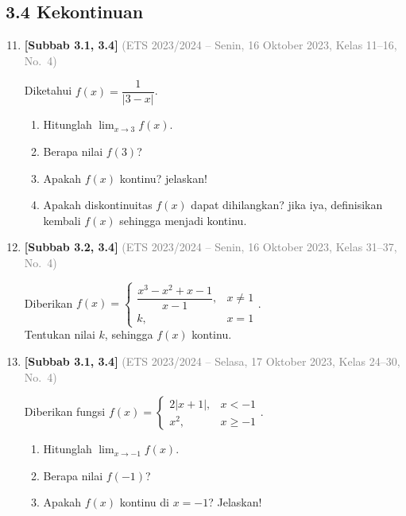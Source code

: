 \documentclass[10pt,openany,a4paper]{article}
\theoremstyle{definition}
\theoremstyle{definition}
\theoremstyle{plain}
\begin{document}
\subsection*{3.4 \quad Kekontinuan}
\begin{enumerate}
\setcounter{enumi}{10}
    \item \textbf{[Subbab 3.1, 3.4]} {\footnotesize\textcolor{gray}{(ETS 2023/2024 -- Senin, 16 Oktober 2023, Kelas 11--16, No.~4)}}\par
    Diketahui $f(x)=\dfrac{1}{|3-x|}$.
    \begin{enumerate}
        \item Hitunglah $\displaystyle\lim_{x\to 3}f(x)$.
        \item Berapa nilai $f(3)$?
        \item Apakah $f(x)$ kontinu? jelaskan!
        \item Apakah diskontinuitas $f(x)$ dapat dihilangkan? jika iya, definisikan kembali $f(x)$ sehingga menjadi kontinu.
    \end{enumerate}

    \item \textbf{[Subbab 3.2, 3.4]} {\footnotesize\textcolor{gray}{(ETS 2023/2024 -- Senin, 16 Oktober 2023, Kelas 31--37, No.~4)}}\par
    Diberikan $f(x)=\begin{cases}
        \dfrac{x^3-x^2+x-1}{x-1}, & x\neq 1\\
        k, & x=1
    \end{cases}$.\\
    Tentukan nilai $k$, sehingga $f(x)$ kontinu.

    \item \textbf{[Subbab 3.1, 3.4]} {\footnotesize\textcolor{gray}{(ETS 2023/2024 -- Selasa, 17 Oktober 2023, Kelas 24--30, No.~4)}}\par
    Diberikan fungsi $f(x)=\begin{cases}
        2|x+1|, & x<-1\\
        x^2, & x\geq -1
    \end{cases}$.
    \begin{enumerate}
        \item Hitunglah $\displaystyle\lim_{x\to-1}f(x)$.
        \item Berapa nilai $f(-1)$?
        \item Apakah $f(x)$ kontinu di $x=-1$? Jelaskan!
    \end{enumerate}


\end{enumerate}
\end{document}
